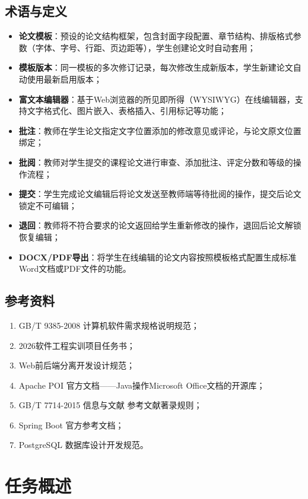 \documentclass{../../softeng}
\begin{document}
\subsection{术语与定义}

\begin{itemize}
    \item \textbf{论文模板}：预设的论文结构框架，包含封面字段配置、章节结构、排版格式参数（字体、字号、行距、页边距等），学生创建论文时自动套用；
    \item \textbf{模板版本}：同一模板的多次修订记录，每次修改生成新版本，学生新建论文自动使用最新启用版本；
    \item \textbf{富文本编辑器}：基于Web浏览器的所见即所得（WYSIWYG）在线编辑器，支持文字格式化、图片嵌入、表格插入、引用标记等功能；
    \item \textbf{批注}：教师在学生论文指定文字位置添加的修改意见或评论，与论文原文位置绑定；
    \item \textbf{批阅}：教师对学生提交的课程论文进行审查、添加批注、评定分数和等级的操作流程；
    \item \textbf{提交}：学生完成论文编辑后将论文发送至教师端等待批阅的操作，提交后论文锁定不可编辑；
    \item \textbf{退回}：教师将不符合要求的论文返回给学生重新修改的操作，退回后论文解锁恢复编辑；
    \item \textbf{DOCX/PDF导出}：将学生在线编辑的论文内容按照模板格式配置生成标准Word文档或PDF文件的功能。
\end{itemize}

\subsection{参考资料}

\begin{enumerate}
    \item GB/T 9385-2008 计算机软件需求规格说明规范；
    \item 2026软件工程实训项目任务书；
    \item Web前后端分离开发设计规范；
    \item Apache POI 官方文档——Java操作Microsoft Office文档的开源库；
    \item GB/T 7714-2015 信息与文献 参考文献著录规则；
    \item Spring Boot 官方参考文档；
    \item PostgreSQL 数据库设计开发规范。
\end{enumerate}

\section{任务概述}
\end{document}
